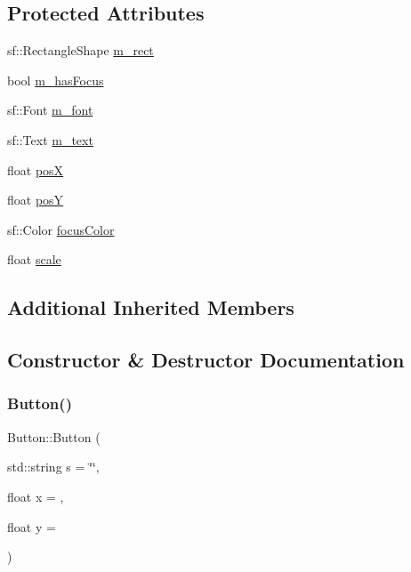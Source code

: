 \subsection*{Protected Attributes}
\begin{DoxyCompactItemize}
\item 
sf\+::\+Rectangle\+Shape \mbox{\hyperlink{class_button_afdd56b2e0647467f01aa57e4fc2740a5}{m\+\_\+rect}}
\item 
bool \mbox{\hyperlink{class_button_a209498deead9cc94c21a79416938268a}{m\+\_\+has\+Focus}}
\item 
sf\+::\+Font \mbox{\hyperlink{class_button_a40795cda9f045088af44fda67977722a}{m\+\_\+font}}
\item 
sf\+::\+Text \mbox{\hyperlink{class_button_adcd0e53c0712aed48b7bd29d33eacf5b}{m\+\_\+text}}
\item 
float \mbox{\hyperlink{class_button_a861c3c732eccf933239c65a1b022e2e8}{posX}}
\item 
float \mbox{\hyperlink{class_button_ad3067b686215a74985c0b39fbb78972f}{posY}}
\item 
sf\+::\+Color \mbox{\hyperlink{class_button_aafa8a827288ccc7413b4e94124dba2a1}{focus\+Color}}
\item 
float \mbox{\hyperlink{class_button_acdb4c06383a37922c645c597f8597ab1}{scale}}
\end{DoxyCompactItemize}
\subsection*{Additional Inherited Members}


\subsection{Constructor \& Destructor Documentation}
\mbox{\label{class_button_acb1ad9758a91672b28c6dfc58f7412ba}} 
\subsubsection{\texorpdfstring{Button()}{Button()}\hspace{0.1cm}{\footnotesize\ttfamily [1/3]}}
{\footnotesize\ttfamily Button\+::\+Button (\begin{DoxyParamCaption}\item[{std\+::string}]{s = {\ttfamily \char`\"{}\char`\"{}},  }\item[{float}]{x = {},  }\item[{float}]{y = {} }\end{DoxyParamCaption})}

